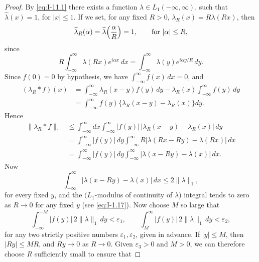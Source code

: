 \begin{proof}
By \eqref{eq:I-11.1} there exists a function $\lambda\in L_1(-\infty,\infty)$, such that $\widehat\lambda(x)=1$, for $|x|\le 1$. If we set, for any fixed $R>0$, $\lambda_R(x)=R\lambda(Rx)$, then
\begin{equation*}
\widehat\lambda_R(\alpha)=\widehat\lambda\Bigl(\frac{\alpha}{R}\Bigr)=1,\qquad\text{for }|\alpha|\le R,
\end{equation*}
since
\begin{equation*}
R\int_{-\infty}^{\infty}\lambda(Rx)e^{i\alpha x}\,dx=\int_{-\infty}^{\infty}\lambda(y)e^{i\alpha y/R}\,dy.
\end{equation*}
Since $\widehat f(0)=0$ by hypothesis, we have $\int_{-\infty}^{\infty}f(x)\,dx=0$, and
\begin{equation*}
\begin{aligned}
(\lambda_R*f)(x) &= \int_{-\infty}^{\infty}\lambda_R(x-y)f(y)\,dy-\lambda_R(x)\int_{-\infty}^{\infty}f(y)\,dy\\
&= \int_{-\infty}^{\infty}f(y)\bigl\{\lambda_R(x-y)-\lambda_R(x)\bigr\}dy.
\end{aligned}
\end{equation*}
Hence
\begin{equation*}
\begin{aligned}
\|\lambda_R*f\|_1
&\le\int_{-\infty}^{\infty}dx\int_{-\infty}^{\infty}|f(y)|\,|\lambda_R(x-y)-\lambda_R(x)|\,dy\\
&= \int_{-\infty}^{\infty}|f(y)|\,dy\int_{-\infty}^{\infty}R|\lambda(Rx-Ry)-\lambda(Rx)|\,dx\\
&= \int_{-\infty}^{\infty}|f(y)|\,dy\int_{-\infty}^{\infty}|\lambda(x-Ry)-\lambda(x)|\,dx.
\end{aligned}
\end{equation*}
Now
\begin{equation*}
\int_{-\infty}^{\infty}|\lambda(x-Ry)-\lambda(x)|\,dx\le 2\|\lambda\|_1,
\end{equation*}
for every fixed $y$, and the $(L_1$-modulus of continuity of $\lambda$) integral tends to zero as $R\to 0$ for any fixed $y$ (see \eqref{eq:I-1.17}). Now choose $M$ so large that
\begin{equation*}
\int_{-\infty}^{-M}|f(y)|\,2\|\lambda\|_1\,dy<\varepsilon_1,\qquad
\int_{M}^{\infty}|f(y)|\,2\|\lambda\|_1\,dy<\varepsilon_2,
\end{equation*}
for any two strictly positive numbers $\varepsilon_1,\varepsilon_2$, given in advance. If $|y|\le M$, then $|Ry|\le MR$, and $Ry\to 0$ as $R\to 0$. Given $\varepsilon_3>0$ and $M>0$, we can therefore choose $R$ sufficiently small to ensure that

\end{proof}
